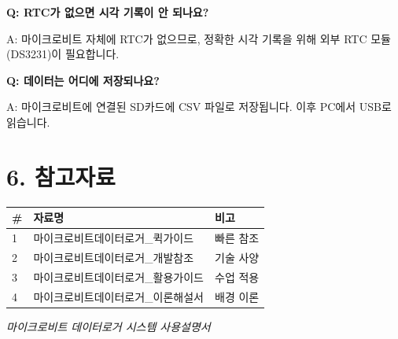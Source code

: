 \documentclass[11pt,a4paper]{article}
\begin{document}
\textbf{Q: RTC가 없으면 시각 기록이 안 되나요?}


A: 마이크로비트 자체에 RTC가 없으므로, 정확한 시각 기록을 위해 외부 RTC 모듈(DS3231)이 필요합니다.


\textbf{Q: 데이터는 어디에 저장되나요?}


A: 마이크로비트에 연결된 SD카드에 CSV 파일로 저장됩니다. 이후 PC에서 USB로 읽습니다.



\section*{6. 참고자료}

\begin{center}
\renewcommand{\arraystretch}{1.4}
\begin{tabular}{|p{1.5cm}|p{10.5cm}|p{3.0cm}|}
\hline
\rowcolor{tableheader}
\textbf{\#} & \textbf{자료명} & \textbf{비고} \\
\hline
1 & 마이크로비트데이터로거\_퀵가이드 & 빠른 참조 \\
\hline
2 & 마이크로비트데이터로거\_개발참조 & 기술 사양 \\
\hline
3 & 마이크로비트데이터로거\_활용가이드 & 수업 적용 \\
\hline
4 & 마이크로비트데이터로거\_이론해설서 & 배경 이론 \\
\hline
\end{tabular}
\end{center}


\vfill
\begin{center}
\small\color{lightbrown}
\textit{마이크로비트 데이터로거 시스템 사용설명서}
\end{center}
\end{document}
